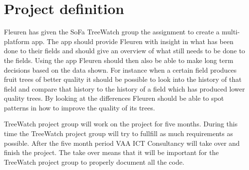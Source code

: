 \section {Project definition}
Fleuren has given the SoFa TreeWatch group the assignment to create a multi-platform \gls{app}. The \gls{app} should provide Fleuren with insight in what has been done to their fields and should give an overview of what still needs to be done to the fields. Using the \gls{app} Fleuren should then also be able to make long term decisions based on the data shown. For instance when a certain field produces fruit trees of better quality it should be possible to look into the history of that field and compare that history to the history of a field which has produced lower quality trees. By looking at the differences Fleuren should be able to spot patterns in how to improve the quality of its trees.

TreeWatch project group will work on the project for five months. During this time the TreeWatch project group will try to fullfill as much requirements as possible. After the five month period VAA ICT Consultancy will take over and finish the project. The take over means that it will be important for the TreeWatch project group to properly document all the code.



